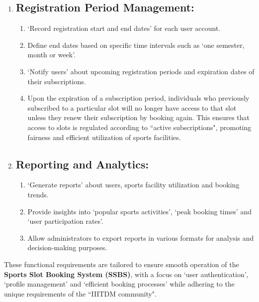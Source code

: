 \documentclass[12pt]{article}
\begin{document}
\begin{enumerate}
    \item[] \subsection{Registration Period Management:}
    \begin{enumerate}[label=\alph*)]
        \item `Record registration start and end dates' for each user account.
        \item Define end dates based on specific time intervals such as `one semester, month or week'.
        \item `Notify users' about upcoming registration periods and expiration dates of their subscriptions.
        \item Upon the expiration of a subscription period, individuals who previously subscribed to a particular slot will no longer have access to that slot unless they renew their subscription by booking again. This ensures that access to slots is regulated according to ``active subscriptions", promoting fairness and efficient utilization of sports facilities.
    \end{enumerate}

    \vspace{0.4cm}

    \item[] \subsection{Reporting and Analytics:}
    \begin{enumerate}[label=\alph*)]
        \item `Generate reports' about users, sports facility utilization and booking trends.
        \item Provide insights into `popular sports activities', `peak booking times' and `user participation rates'.
        \item Allow administrators to export reports in various formats for analysis and decision-making purposes.
    \end{enumerate}
   
\end{enumerate}

\vspace{0.2cm}

\newpage

\noindent These functional requirements are tailored to ensure smooth operation of the \textbf{Sports Slot Booking System (SSBS)}, with a focus on `user authentication', `profile management' and `efficient booking processes' while adhering to the unique requirements of the ``IIITDM community".
\end{document}
